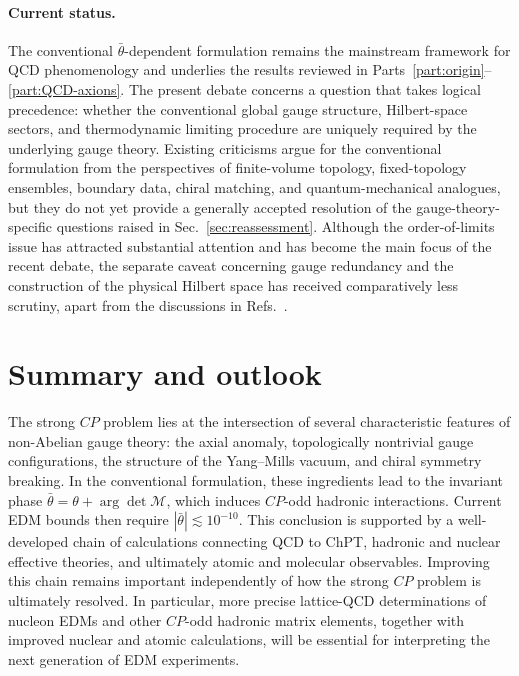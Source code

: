 \documentclass[review]{elsarticle}
\numberwithin{equation}{section}
\numberwithin{table}{section}
\numberwithin{figure}{section}
\def\M{\mathcal{M}}
\begin{document}
\paragraph{Current status.}

The conventional $\bar\theta$-dependent formulation remains the mainstream framework for QCD phenomenology and underlies the results reviewed in Parts~\ref{part:origin}--\ref{part:QCD-axions}. The present debate concerns a question that takes logical precedence: whether the conventional global gauge structure, Hilbert-space sectors, and thermodynamic limiting procedure are uniquely required by the underlying gauge theory. Existing criticisms argue for the conventional formulation from the perspectives of finite-volume topology, fixed-topology ensembles, boundary data, chiral matching, and quantum-mechanical analogues, but they do not yet provide a generally accepted resolution of the gauge-theory-specific questions raised in Sec.~\ref{sec:reassessment}. Although the order-of-limits issue has attracted substantial attention and has become the main focus of the recent debate, the separate caveat concerning gauge redundancy and the construction of the physical Hilbert space has received comparatively less scrutiny, apart from the discussions in Refs.~\cite{Ai:2024vfa,Williams:2026cec}.

\section{Summary and outlook}
\label{sec:summary-outlook}

The strong $CP$ problem lies at the intersection of several characteristic features of non-Abelian gauge theory: the axial anomaly, topologically nontrivial gauge configurations, the structure of the Yang--Mills vacuum, and chiral symmetry breaking. In the conventional formulation, these ingredients lead to the invariant phase $\bar\theta=\theta+\arg\det\M$, which induces $CP$-odd hadronic interactions. Current EDM bounds then require $|\bar\theta|\lesssim10^{-10}$. This conclusion is supported by a well-developed chain of calculations connecting QCD to ChPT, hadronic and nuclear effective theories, and ultimately atomic and molecular observables. Improving this chain remains important independently of how the strong $CP$ problem is ultimately resolved. In particular, more precise lattice-QCD determinations of nucleon EDMs and other $CP$-odd hadronic matrix elements, together with improved nuclear and atomic calculations, will be essential for interpreting the next generation of EDM experiments.
\end{document}
